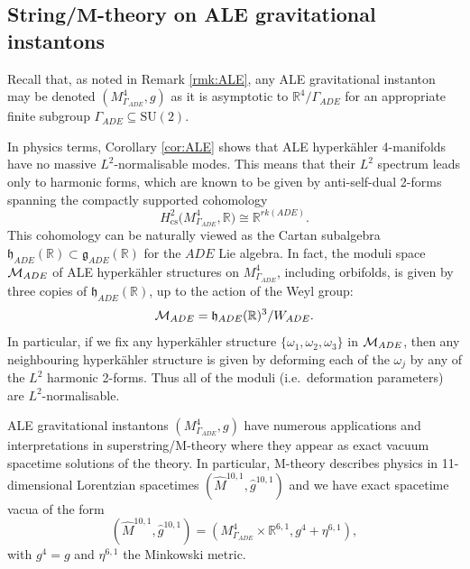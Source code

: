 \documentclass{article}
\theoremstyle{definition}
\numberwithin{thm}{section}
\numberwithin{equation}{section}
\def\R{\mathbb{R}}
\begin{document}
\subsection{String/\texorpdfstring{$\mathbf{M}$}{M}-theory on ALE gravitational instantons}  Recall that, as noted in Remark \ref{rmk:ALE}, any ALE gravitational instanton may be denoted $(M^4_{\Gamma_{ADE}},g)$ as it is asymptotic to $\R^4/\Gamma_{ADE}$ for an appropriate finite subgroup $\Gamma_{ADE}\subseteq\mathrm{SU}(2)$.

In physics terms, Corollary \ref{cor:ALE} shows that ALE hyperk\"ahler 4-manifolds  
 have no massive  $L^2$-normalisable modes. This means that their $L^2$ spectrum leads only to harmonic forms, which are known \cite{Hausel} to be given by anti-self-dual %
 2-forms spanning the compactly supported cohomology 
 \begin{equation}
 H^2_{\text{cs}}(M^4_{\Gamma_{ADE}},\mathbb{R)} \cong \mathbb{R}^{rk(ADE)}.
 \end{equation}
 This cohomology can be naturally viewed as the Cartan subalgebra $\mathfrak{h}_{ADE}(\mathbb{R}) \subset \mathfrak{g}_{ADE}(\mathbb{R})$ for the $ADE$ Lie algebra. In fact, the moduli space ${\cal{M}}_{ADE}$ of ALE hyperk\"ahler structures on $M^4_{\Gamma_{ADE}}$, including orbifolds, is given by three copies of $\mathfrak{h}_{ADE}(\mathbb{R})$, up to the action of the Weyl group:
\begin{equation}\label{eq:M.ADE}
    {\cal{M}}_{ADE} = \mathfrak{h}_{ADE}(\mathbb{R})^3/W_{ADE}.
\end{equation}
In particular, if we fix any hyperk\"ahler structure $\{\omega_1,\omega_2,\omega_3\}$ in ${\cal{M}}_{ADE}$, then any neighbouring hyperk\"ahler structure is given by deforming each of the $\omega_j$ by any of the $L^2$  harmonic 2-forms. Thus all of the moduli (i.e.~deformation parameters) are $L^2$-normalisable. 

 ALE gravitational instantons $(M^4_{\Gamma_{ADE}},g)$ have numerous applications and interpretations in superstring/M-theory where they appear as exact vacuum spacetime solutions of the theory. In particular, M-theory describes physics in 11-dimensional Lorentzian spacetimes 
 $(\hat{M}^{10,1}, \hat{g}^{10,1})$ and we have exact spacetime vacua of the form 
 \begin{equation}\label{eq:ALE.vacua}
 (\hat{M}^{10,1}, \hat{g}^{10,1})=(M^4_{\Gamma_{ADE}} \times \mathbb{R}^{6,1},  g^4 + \eta^{6,1}),
 \end{equation}
 with $g^4=g$ and $\eta^{6,1}$ the Minkowski metric. 
 
\end{document}
